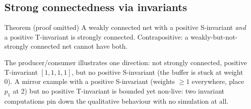 \subsection{Strong connectedness via invariants}

\begin{notebox}{Theorem (proof omitted)}
A weakly connected net with a positive S-invariant \emph{and} a positive T-invariant is strongly connected. Contrapositive: a weakly-but-not-strongly connected net cannot have both.
\end{notebox}

The producer/consumer illustrates one direction: not strongly connected, positive T-invariant $[1,1,1,1]$, but no positive S-invariant (the buffer is stuck at weight 0). A mirror example with a positive S-invariant (weights $\geq 1$ everywhere, place $p_1$ at 2) but no positive T-invariant is bounded yet non-live: two invariant computations pin down the qualitative behaviour with no simulation at all.
